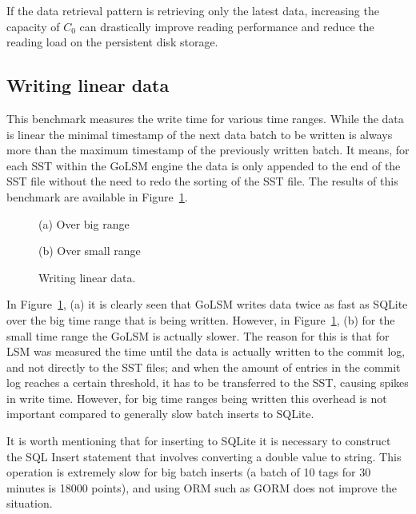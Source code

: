 If the data retrieval pattern is retrieving only the latest data, increasing the capacity of $C_0$ can drastically improve reading performance and reduce the reading load on the persistent disk storage.

\subsection{Writing linear data}

This benchmark measures the write time for various time ranges. While the data is linear the minimal timestamp of the next data batch to be written is always more than the maximum timestamp of the previously written batch. It means, for each SST within the GoLSM engine the data is only appended to the end of the SST file without the need to redo the sorting of the SST file. The results of this benchmark are available in Figure~\ref{fig6}.

\begin{figure}[!htb]
	\begin{minipage}{0.48\textwidth}
		\centering
		\resizebox{\textwidth}{!}{%
			
		}
		\label{figure}{(a) Over big range}
	\end{minipage}\hfill
	\begin{minipage}{0.48\textwidth}
		\centering
		\resizebox{\textwidth}{!}{%
			
		}
		\label{figure}{(b) Over small range}
	\end{minipage}
	
	\caption{Writing linear data.}\label{fig6}
\end{figure}

In Figure~\ref{fig6}, (a) it is clearly seen that GoLSM writes data twice as fast as SQLite over the big time range that is being written.  However, in Figure~\ref{fig6}, (b) for the small time range the GoLSM is actually slower. The reason for this is that for LSM was measured the time until the data is actually written to the commit log, and not directly to the SST files; and when the amount of entries in the commit log reaches a certain threshold, it has to be transferred to the SST, causing spikes in write time. However, for big time ranges being written this overhead is not important compared to generally slow batch inserts to SQLite. 

It is worth mentioning that for inserting to SQLite it is necessary to construct the SQL Insert statement that involves converting a double value to string. This operation is extremely slow for big batch inserts (a batch of 10 tags for 30 minutes is 18000 points), and using ORM such as GORM does not improve the situation.

